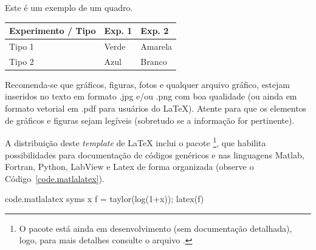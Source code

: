 \documentclass[12pt, a4paper, twoside, onecolumn]{article}
\begin{document}
\begin{quadro}[ht!]
  \centering {} \setlength\aboverulesep{0pt} \setlength\belowrulesep{0pt}
  \caption{Este é um exemplo de um quadro.}
    \fontsize{11}{12}\selectfont 
    \begin{tabular}{| C{2.8cm} | C{1.8cm} | C{1.8cm} |}
    \hline
    \textbf{ Experimento / Tipo } & \textbf{Exp. 1} & \textbf{Exp. 2}\\
	\midrule
		Tipo 1& Verde & Amarela\\
		 Tipo 2 & Azul & Branco\\
	\hline
    \end{tabular}
    \label{quad.exemplo}%
    \vspace{2mm}
\end{quadro}%



Recomenda-se que gráficos, figuras, fotos e qualquer arquivo gráfico, estejam inseridos no texto em formato .jpg e/ou .png com boa qualidade (ou ainda em formato vetorial em .pdf para usuários do \LaTeX\xspace). Atente para que os elementos de gráficos e figuras sejam legíveis (sobretudo se a informação for pertinente).


A distribuição deste \textit{template} de \LaTeX\xspace inclui o pacote \footnote{O pacote está ainda em desenvolvimento (sem documentação detalhada), logo, para mais detalhes consulte o arquivo .}, que habilita possibilidades para documentação de códigos genéricos e nas linguagens Matlab, Fortran, Python, LabView e Latex de forma organizada (observe o Código~\ref{code.matlalatex}).

\clearpage
\begin{matlabcode}{code.matlalatex}
  syms x
  f = taylor(log(1+x));
  latex(f)
\end{matlabcode}
\end{document}

